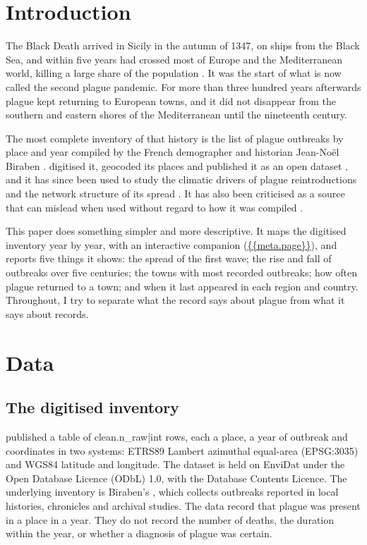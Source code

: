 \documentclass[11pt,a4paper]{article}
\begin{document}
\section{Introduction}
The Black Death arrived in Sicily in the autumn of 1347, on ships from the Black Sea, and within five years had crossed most of Europe and the Mediterranean world, killing a large share of the population \citep{benedictow2004}. It was the start of what is now called the second plague pandemic. For more than three hundred years afterwards plague kept returning to European towns, and it did not disappear from the southern and eastern shores of the Mediterranean until the nineteenth century.

The most complete inventory of that history is the list of plague outbreaks by place and year compiled by the French demographer and historian Jean-No\"el Biraben \citep{biraben1975}. \citet{buntgen2012} digitised it, geocoded its places and published it as an open dataset \citep{envidat}, and it has since been used to study the climatic drivers of plague reintroductions \citep{schmid2015} and the network structure of its spread \citep{gomez2017}. It has also been criticised as a source that can mislead when used without regard to how it was compiled \citep{roosen2018}.

This paper does something simpler and more descriptive. It maps the digitised inventory year by year, with an interactive companion (\url{{{meta.page}}}), and reports five things it shows: the spread of the first wave; the rise and fall of outbreaks over five centuries; the towns with most recorded outbreaks; how often plague returned to a town; and when it last appeared in each region and country. Throughout, I try to separate what the record says about plague from what it says about records.

\section{Data}
\subsection{The digitised inventory}
\citet{buntgen2012} published a table of {{clean.n_raw|int}} rows, each a place, a year of outbreak and coordinates in two systems: ETRS89 Lambert azimuthal equal-area (EPSG:3035) and WGS84 latitude and longitude. The dataset is held on EnviDat \citep{envidat} under the Open Database Licence (ODbL) 1.0, with the Database Contents Licence. The underlying inventory is Biraben's \citep{biraben1975}, which collects outbreaks reported in local histories, chronicles and archival studies. The data record that plague was present in a place in a year. They do not record the number of deaths, the duration within the year, or whether a diagnosis of plague was certain.
\end{document}
